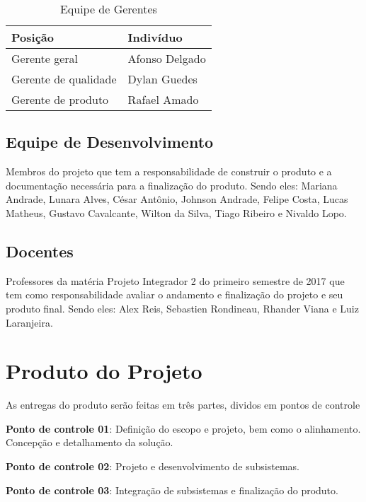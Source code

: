 \begin{table}[]
\centering
\caption{Equipe de Gerentes}
\label{equipe_gerentes}
\begin{tabular}{|l|l|}
\hline
Posição              & Indivíduo      \\ \hline
Gerente geral        & Afonso Delgado \\ \hline
Gerente de qualidade & Dylan Guedes   \\ \hline
Gerente de produto   & Rafael Amado   \\ \hline
\end{tabular}
\end{table}

\subsection{Equipe de Desenvolvimento}
Membros do projeto que tem a responsabilidade de construir o produto e a 
documentação necessária para a finalização do produto. Sendo eles: Mariana 
Andrade, Lunara Alves, César Antônio, Johnson Andrade, Felipe Costa, Lucas 
Matheus, Gustavo Cavalcante, Wilton da Silva, Tiago Ribeiro e Nivaldo Lopo.


\subsection{Docentes}
Professores da matéria Projeto Integrador 2 do primeiro semestre de 2017 que 
tem como responsabilidade avaliar o andamento e finalização do projeto e seu 
produto final. Sendo eles: Alex Reis, Sebastien Rondineau, Rhander Viana e 
Luiz Laranjeira.

\section{Produto do Projeto}
As entregas do produto serão feitas em três partes, dividos em pontos de controle

\textbf{Ponto de controle 01}: Definição do escopo e projeto, bem como o 
alinhamento. Concepção e detalhamento da solução.

\textbf{Ponto de controle 02}: Projeto e desenvolvimento de subsistemas.


\textbf{Ponto de controle 03}: Integração de subsistemas e finalização do 
produto.

